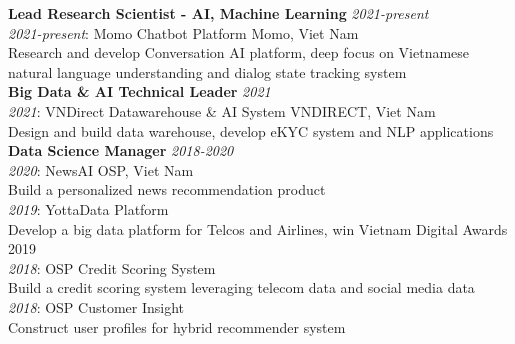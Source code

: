 \documentclass[11pt,a4paper,roman]{article}
\begin{document}
\noindent
\textbf{Lead Research Scientist - AI, Machine Learning}
\hfill
\textit{2021-present}
\\
\textit{2021-present}: Momo Chatbot Platform
\hfill
Momo, Viet Nam
\\
Research and develop Conversation AI platform, deep focus on Vietnamese natural language understanding and dialog state tracking system
\\

\noindent
\textbf{Big Data \& AI Technical Leader}
\hfill
\textit{2021}
\\
\textit{2021}: VNDirect Datawarehouse \& AI System
\hfill
VNDIRECT, Viet Nam
\\
Design and build data warehouse, develop eKYC system and NLP applications
\\

\noindent
\textbf{Data Science Manager}
\hfill
\textit{2018-2020}
\\
\textit{2020}: NewsAI
\hfill
OSP, Viet Nam
\\
Build a personalized news recommendation product
\\
\textit{2019}: YottaData Platform
\\
Develop a big data platform for Telcos and Airlines, win Vietnam Digital Awards 2019
\\
\textit{2018}: OSP Credit Scoring System
\\
Build a credit scoring system leveraging telecom data and social media data
\\
\textit{2018}: OSP Customer Insight
\\
Construct user profiles for hybrid recommender system
\\
\end{document}
